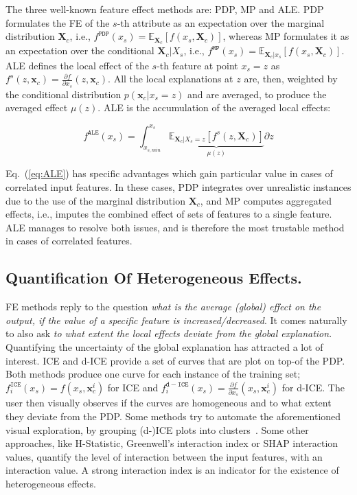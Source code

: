 \documentclass[twoside]{article}
\newcommand{\xc}{\mathbf{x}_c}
\newcommand{\Xcb}{\mathbf{X}_c}
\begin{document}
The three well-known feature effect methods are: PDP, MP and ALE. PDP
formulates the FE of the \(s\)-th attribute as an expectation over the
marginal distribution \(\mathbf{X}_c\), i.e.,
\(f^{\mathtt{PDP}}(x_s) =
\mathbb{E}_{\mathbf{X}_c}[f(x_s,\mathbf{X}_c)]\), whereas MP
formulates it as an expectation over the conditional
\(\mathbf{X}_c|X_s\), i.e.,
\(f^{\mathtt{MP}}(x_s) = \mathbb{E}_{\mathbf{X}_c|x_s}[f(x_s,
\mathbf{X}_c)]\). ALE defines the local effect of the \(s\)-th feature
at point \(x_s = z\) as
\(f^s(z, \xc) = \frac{\partial f}{\partial x_s} (z, \xc)\). All the
local explanations at \(z\) are, then, weighted by the conditional
distribution \(p(\xc|x_s=z)\) and are averaged, to produce the
averaged effect \(\mu(z)\). ALE is the accumulation of the averaged
local effects:

\begin{equation}
  \label{eq:ALE}
  f^{\mathtt{ALE}}(x_s) = \int_{x_{s,min}}^{x_s} \underbrace{\mathbb{E}_{\Xcb|X_s=z}\left [f^s (z, \Xcb)\right ]}_{\mu(z)} \partial z
\end{equation}


Eq.~(\ref{eq:ALE}) has specific advantages which gain particular value in cases of
correlated input features. In these cases, PDP integrates over
unrealistic instances due to the use of the marginal distribution
\(\mathbf{X}_c \), and MP computes aggregated effects, i.e., imputes
the combined effect of sets of features to a single feature. ALE
manages to resolve both issues, and is therefore the most trustable
method in cases of correlated features.

\subsection{Quantification Of Heterogeneous Effects.}
\label{sec:quant-heter-effects}

FE methods reply to the question \textit{what is the average (global)
  effect on the output, if the value of a specific feature is
  increased/decreased}. It comes naturally to also ask \textit{to what
  extent the local effects deviate from the global
  explanation}. Quantifying the uncertainty of the global explanation
has attracted a lot of interest. ICE and
d-ICE\citep{goldstein2015peeking} provide a set of curves that are
plot on top-of the PDP. Both methods produce one curve for each
instance of the training set;
\(f^{\mathtt{ICE}}_i(x_s) = f(x_s, \xc^i)\) for ICE and
\(f^{\mathtt{d-ICE}}_i(x_s) = \frac{\partial f}{\partial x_s} (x_s,
\xc^i)\) for d-ICE. The user then visually observes if the curves are
homogeneous and to what extent they deviate from the PDP. Some methods
try to automate the aforementioned visual exploration, by grouping
(d-)ICE plots into clusters~\citep{molnar2020model,
  herbinger2022repid, britton2019vine}. Some other approaches, like
H-Statistic\citep{friedman2008predictive}, Greenwell's interaction
index\citep{greenwell2018simple} or SHAP interaction
values\citep{lundberg2018consistent}, quantify the level of
interaction between the input features, with an interaction value. A
strong interaction index is an indicator for the existence of
heterogeneous effects.
\end{document}
